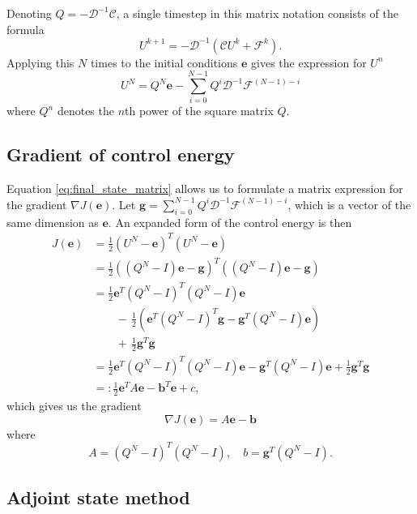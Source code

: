 \documentclass[utf8,english]{gradu3}
\begin{document}
Denoting $Q = -\mathcal{D}^{-1} \mathcal{C}$,
a single timestep in this matrix notation consists of the formula
\begin{equation}\label{eq:forward_timestep_matrix}
  U^{k+1} = -\mathcal{D}^{-1} (\mathcal{C} U^k + \mathcal{F}^k).
\end{equation}
Applying this $N$ times to the initial conditions $\mathbf{e}$ 
gives the expression for $U^n$
\begin{equation}\label{eq:final_state_matrix}
  U^N = Q^N \mathbf{e}
  - \sum_{i=0}^{N-1} Q^i \mathcal{D}^{-1} \mathcal{F}^{(N-1)-i}
\end{equation}
where $Q^n$ denotes the $n$th power of the square matrix $Q$.

\subsection{Gradient of control energy}

Equation \eqref{eq:final_state_matrix} allows us to formulate
a matrix expression for the gradient $\nabla J(\mathbf{e})$.
Let $\mathbf{g} = \sum_{i=0}^{N-1} Q^i \mathcal{D}^{-1} \mathcal{F}^{(N-1)-i}$,
which is a vector of the same dimension as $\mathbf{e}$.
An expanded form of the control energy is then
\begin{align*}
  J(\mathbf{e})
  &= \frac{1}{2} (U^N - \mathbf{e})^T (U^N - \mathbf{e}) \\
  &= \frac{1}{2} ((Q^N - I) \mathbf{e} - \mathbf{g})^T ((Q^N - I) \mathbf{e} - \mathbf{g}) \\
  &= \frac{1}{2} \mathbf{e}^T (Q^N - I)^T (Q^N - I) \mathbf{e} \\
  &\qquad -\, \frac{1}{2} (\mathbf{e}^T (Q^N - I)^T \mathbf{g}
    - \mathbf{g}^T (Q^N - I)\mathbf{e}) \\
  &\qquad +\, \frac{1}{2} \mathbf{g}^T \mathbf{g} \\
  &= \frac{1}{2} \mathbf{e}^T (Q^N - I)^T (Q^N - I) \mathbf{e}
  - \mathbf{g}^T (Q^N - I)\mathbf{e}
  + \frac{1}{2} \mathbf{g}^T \mathbf{g} \\
  &=: \frac{1}{2}\mathbf{e}^T A \mathbf{e} - \mathbf{b}^T \mathbf{e} + c,
\end{align*}
which gives us the gradient
\begin{equation}\label{eq:control_gradient}
  \nabla J(\mathbf{e}) = A\mathbf{e} - \mathbf{b}
\end{equation}
where
\[
  A = (Q^N - I)^T (Q^N - I),
  \quad b = \mathbf{g}^T (Q^N - I).
\]


\subsection{Adjoint state method}\label{sec:adjoint_state_method}
\end{document}
